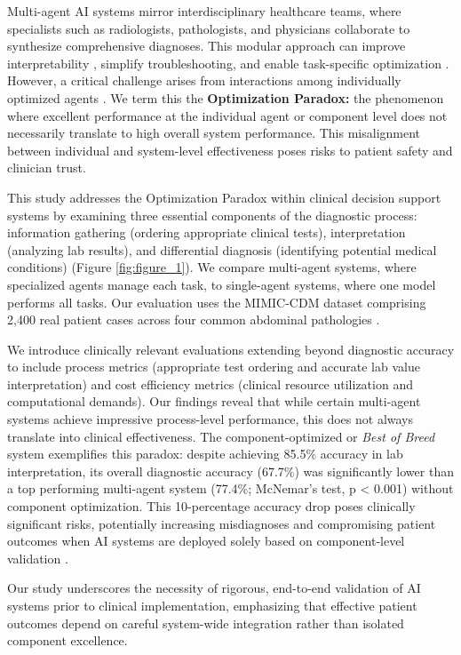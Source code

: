 \documentclass[manuscript, nonacm]{acmart}
\begin{document}
Multi-agent AI systems mirror interdisciplinary healthcare teams, where specialists such as radiologists, pathologists, and physicians collaborate to synthesize comprehensive diagnoses. This modular approach can improve interpretability \cite{gordon2024ai}, simplify troubleshooting, and enable task-specific optimization \cite{shu2025unlocking}. However, a critical challenge arises from interactions among individually optimized agents \cite{eliot2024multiagent}. We term this the \textbf{Optimization Paradox:} the phenomenon where excellent performance at the individual agent or component level does not necessarily translate to high overall system performance. This misalignment between individual and system-level effectiveness poses risks to patient safety and clinician trust.

This study addresses the Optimization Paradox within clinical decision support systems by examining three essential components of the diagnostic process: information gathering (ordering appropriate clinical tests), interpretation (analyzing lab results), and differential diagnosis (identifying potential medical conditions) (Figure \ref{fig:figure_1}). We compare multi-agent systems, where specialized agents manage each task, to single-agent systems, where one model performs all tasks. Our evaluation uses the MIMIC-CDM dataset comprising 2,400 real patient cases across four common abdominal pathologies \cite{hager2024evaluation}. 

We introduce clinically relevant evaluations extending beyond diagnostic accuracy to include process metrics (appropriate test ordering and accurate lab value interpretation) and cost efficiency metrics (clinical resource utilization and computational demands). Our findings reveal that while certain multi-agent systems achieve impressive process-level performance, this does not always translate into clinical effectiveness. The component-optimized or \textit{Best of Breed} system exemplifies this paradox: despite achieving 85.5\% accuracy in lab interpretation, its overall diagnostic accuracy (67.7\%) was significantly lower than a top performing multi-agent system (77.4\%; McNemar's test, p < 0.001) without component optimization. This 10-percentage accuracy drop poses clinically significant risks, potentially increasing misdiagnoses and compromising patient outcomes when AI systems are deployed solely based on component-level validation \cite{Macaluso2012AbdominalPain}.

Our study underscores the necessity of rigorous, end-to-end validation of AI systems prior to clinical implementation, emphasizing that effective patient outcomes depend on careful system-wide integration rather than isolated component excellence. 
\end{document}
